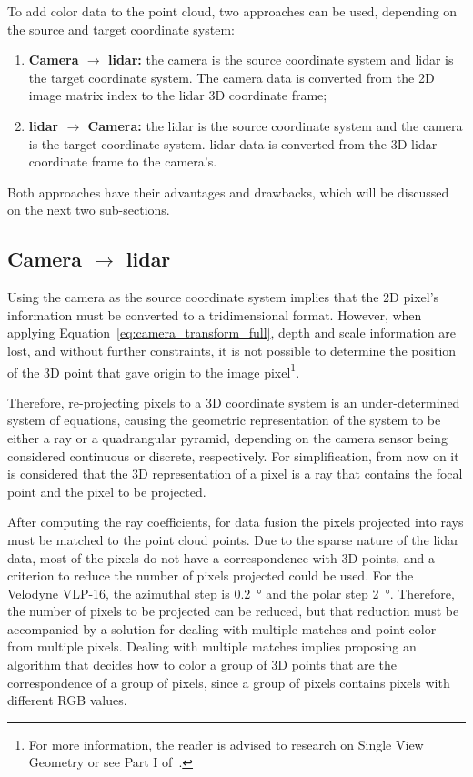 To add color data to the point cloud, two approaches can be used, depending on the source and target coordinate system:

\begin{enumerate} 
	\item \textbf{Camera $\rightarrow$ \ac{lidar}:} the camera is the source coordinate system and \ac{lidar} is the target coordinate system. The camera data is converted from the 2D image  matrix index to the \ac{lidar} 3D coordinate frame;
	\item \textbf{\ac{lidar} $\rightarrow$ Camera:} the \ac{lidar} is the source coordinate system and the camera is the target coordinate system. \ac{lidar} data is converted from the 3D \ac{lidar} coordinate frame to the camera's.
\end{enumerate}

Both approaches have their advantages and drawbacks, which will be discussed on the next two sub-sections.

\subsection{Camera $\rightarrow$ \acs{lidar}} 
Using the camera as the source coordinate system implies that the 2D pixel's information must be converted to a tridimensional format. However, when applying Equation~\eqref{eq:camera_transform_full}, depth and scale information are lost, and without further constraints, it is not possible to determine the position of the 3D point that gave origin to the image pixel\footnote{For more information, the reader is advised to research on Single View Geometry or see Part I of~\cite{mvg_book}.}. 

Therefore, re-projecting pixels to a 3D coordinate system is an under-determined system of equations, causing the geometric representation of the system to be either a ray or a quadrangular pyramid, depending on the camera sensor being considered continuous or discrete, respectively. For simplification, from now on it is considered that the 3D representation of a pixel is a ray that contains the focal point and the pixel to be projected.

After computing the ray coefficients, for data fusion the pixels projected into rays must be matched to the point cloud points. Due to the sparse nature of the \ac{lidar} data, most of the pixels do not have a correspondence with 3D points, and a criterion to reduce the number of pixels projected could be used. For the Velodyne VLP-16, the azimuthal step is \SI{0.2}{\degree} and the polar step \SI{2}{\degree}. Therefore, the number of pixels to be projected can be reduced, but that reduction must be accompanied by a solution for dealing with multiple matches and point color from multiple pixels. Dealing with multiple matches implies proposing an algorithm that decides  how to color a group of 3D points that are the correspondence of a group of pixels, since a group of pixels contains pixels with different RGB values.

